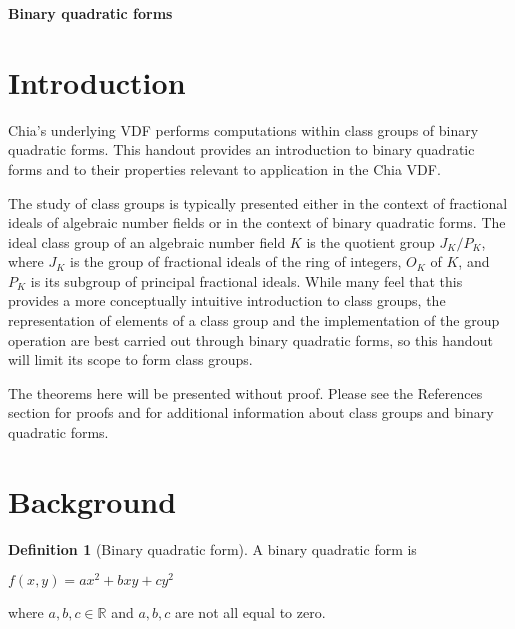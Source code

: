 \documentclass{article}
\theoremstyle{definition}
\newtheorem{definition}{Definition}[section]
\theoremstyle{theorem}
\theoremstyle{example}
\theoremstyle{corollary}
\begin{document}
\begin{center}
\LARGE{\textbf{Binary quadratic forms}}
\end{center}



\bigskip
\bigskip
\bigskip




\bigskip

\section{Introduction}

\bigskip

Chia's underlying VDF performs computations within class groups of binary quadratic forms. This handout provides an introduction to binary quadratic forms and to their properties relevant to application in the Chia VDF.

\bigskip

The study of class groups is typically presented either in the context of fractional ideals of algebraic number fields or in the context of binary quadratic forms. The ideal class group of an algebraic number field \(K\) is the quotient group \(J_{K}/P_{K}\), where \(J_{K}\) is the group of fractional ideals of the ring of integers, \(O_{K}\) of \(K\), and \(P_{K}\) is its subgroup of principal fractional ideals. While many feel that this provides a more conceptually intuitive introduction to class groups, the representation of elements of a class group and the implementation of the group operation are best carried out through binary quadratic forms, so this handout will limit its scope to form class groups.

\bigskip

The theorems here will be presented without proof. Please see the References section for proofs and for additional information about class groups and binary quadratic forms.








\bigskip

\section{Background}

\bigskip

\theoremstyle{definition}
\begin{definition}[Binary quadratic form]
A binary quadratic form is
\begin{center}
\(f(x, y) = a x^{2} + b x y + c y^{2}\)
\end{center}
where \(a, b, c \in \mathbb{R}\) and \(a, b, c\) are not all equal to zero.
\end{definition}
\end{document}
